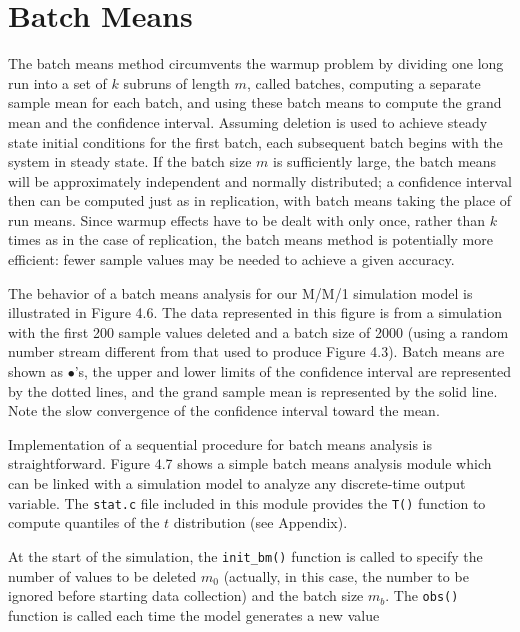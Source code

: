 \section{Batch Means}
\label{sec:batch-means}

The batch means method circumvents the warmup problem by dividing one long
run into a set of $k$ subruns of length $m$, called batches, computing a
separate sample mean for each batch, and using these batch means to compute
the grand mean and the confidence interval. Assuming deletion is used to
achieve steady state initial conditions for the first batch, each subsequent
batch begins with the system in steady state. If the batch size $m$ is
sufficiently large, the batch means will be approximately independent and
normally distributed; a confidence interval then can be computed just as in
replication, with batch means taking the place of run means. Since warmup
effects have to be dealt with only once, rather than $k$ times as in the case
of replication, the batch means method is potentially more efficient: fewer
sample values may be needed to achieve a given accuracy.

The behavior of a batch means analysis for our M/M/1 simulation model
is illustrated in Figure 4.6. The data represented in this figure is from a
simulation with the first 200 sample values deleted and a batch size of 2000
(using a random number stream different from that used to produce Figure
4.3). Batch means are shown as $\bullet$'s, the upper and lower limits of the
confidence interval are represented by the dotted lines, and the grand sample
mean is represented by the solid line. Note the slow convergence of the
confidence interval toward the mean.



{\sloppy Implementation of a sequential procedure for batch means analysis is
straightforward. Figure 4.7 shows a simple batch means analysis module which
can be linked with a simulation model to analyze any discrete-time output
variable. The \texttt{stat.c} file included in this module provides the
\texttt{T()} function to compute quantiles of the $t$ distribution (see Appendix).\par}



At the start of the simulation, the \texttt{init\_bm()} function is called to
specify the number of values to be deleted $m_0$ (actually, in this case, the
number to be ignored before starting data collection) and the batch size $m_b$.
The \texttt{obs()} function is called each time the model generates a new value

